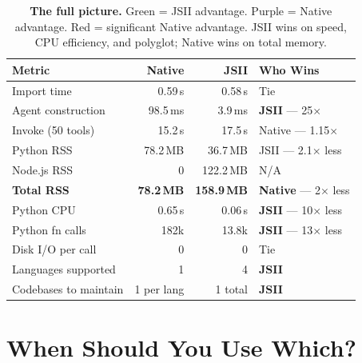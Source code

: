 \documentclass[11pt]{article}
\begin{document}
\begin{table}[H]
\centering
\renewcommand{\arraystretch}{1.4}
\large
\begin{tabular}{@{}l r r l@{}}
\toprule
\textbf{\sffamily Metric} & \textbf{\sffamily Native} & \textbf{\sffamily JSII} & \textbf{\sffamily Who Wins} \\
\midrule
\textsf{Import time} & 0.59\,s & 0.58\,s & \cellcolor{codebg}\textsf{Tie} \\
\textsf{Agent construction} & 98.5\,ms & 3.9\,ms & \cellcolor{nativelt}\textsf{\textbf{JSII} — 25$\times$} \\
\textsf{Invoke (50 tools)} & 15.2\,s & 17.5\,s & \cellcolor{jsiilt}\textsf{Native — 1.15$\times$} \\
\midrule
\textsf{Python RSS} & 78.2\,MB & 36.7\,MB & \cellcolor{nativelt}\textsf{JSII — 2.1$\times$ less} \\
\textsf{Node.js RSS} & 0 & 122.2\,MB & \cellcolor{jsiilt}\textsf{N/A} \\
\textsf{\textbf{Total RSS}} & \textbf{78.2\,MB} & \textbf{158.9\,MB} & \cellcolor{warnlt}\textsf{\textbf{Native} — 2$\times$ less} \\
\midrule
\textsf{Python CPU} & 0.65\,s & 0.06\,s & \cellcolor{nativelt}\textsf{\textbf{JSII} — 10$\times$ less} \\
\textsf{Python fn calls} & 182k & 13.8k & \cellcolor{nativelt}\textsf{\textbf{JSII} — 13$\times$ less} \\
\textsf{Disk I/O per call} & 0 & 0 & \cellcolor{codebg}\textsf{Tie} \\
\midrule
\textsf{Languages supported} & 1 & 4 & \cellcolor{nativelt}\textsf{\textbf{JSII}} \\
\textsf{Codebases to maintain} & 1 per lang & 1 total & \cellcolor{nativelt}\textsf{\textbf{JSII}} \\
\bottomrule
\end{tabular}
\caption{\textbf{The full picture.} \colorbox{nativelt}{\textsf{Green}} = JSII advantage. \colorbox{jsiilt}{\textsf{Purple}} = Native advantage. \colorbox{warnlt}{\textsf{Red}} = significant Native advantage. JSII wins on speed, CPU efficiency, and polyglot; Native wins on total memory.}
\label{tab:scorecard}
\end{table}

\section{When Should You Use Which?}
\end{document}
